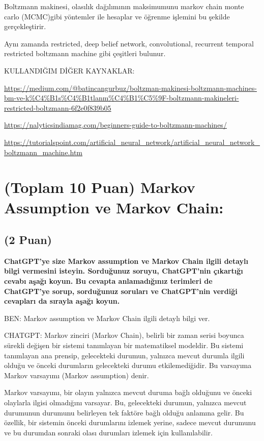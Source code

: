 \documentclass[11pt]{article}
\begin{document}
Boltzmann makinesi, olasılık dağılımının maksimumunu markov chain monte carlo (MCMC)gibi yöntemler ile hesaplar ve öğrenme işlemini bu şekilde gerçekleştirir.

Aynı zamanda restricted, deep belief network, convolutional, recurrent temporal restricted boltzmann machine gibi çeşitleri bulunur.

KULLANDIĞIM  DİĞER KAYNAKLAR:

\url{https://medium.com/@batincangurbuz/boltzman-makinesi-boltzmann-machines-bm-ve-k%C4%B1s%C4%B1tlanm%C4%B1%C5%9F-boltzmann-makineleri-restricted-boltzmann-6f2e0f839b05}

\url{https://nalyticsindiamag.com/beginners-guide-to-boltzmann-machines/}

\url{https://tutorialspoint.com/artificial_neural_network/artificial_neural_network_boltzmann_machine.htm}


\section{(Toplam 10 Puan) Markov Assumption ve Markov Chain:}

\subsection{(2 Puan)} \textbf{ChatGPT’ye size Markov assumption ve Markov Chain ilgili detaylı bilgi vermesini isteyin. Sorduğunuz soruyu, ChatGPT'nin çıkartığı cevabı aşağı koyun. Bu cevapta anlamadığınız terimleri de ChatGPT’ye sorup, sorduğunuz soruları ve ChatGPT’nin verdiği cevapları da sırayla aşağı koyun.}

BEN: Markov assumption ve Markov Chain ilgili detaylı bilgi ver.

CHATGPT: Markov zinciri (Markov Chain), belirli bir zaman serisi boyunca sürekli değişen bir sistemi tanımlayan bir matematiksel modeldir. Bu sistemi tanımlayan ana prensip, gelecekteki durumun, yalnızca mevcut durumla ilgili olduğu ve önceki durumların gelecekteki durumu etkilemediğidir. Bu varsayıma Markov varsayımı (Markov assumption) denir.

Markov varsayımı, bir olayın yalnızca mevcut duruma bağlı olduğunu ve önceki olaylarla ilgisi olmadığını varsayar. Bu, gelecekteki durumun, yalnızca mevcut durumunun durumunu belirleyen tek faktöre bağlı olduğu anlamına gelir. Bu özellik, bir sistemin önceki durumlarını izlemek yerine, sadece mevcut durumunu ve bu durumdan sonraki olası durumları izlemek için kullanılabilir.
\end{document}
